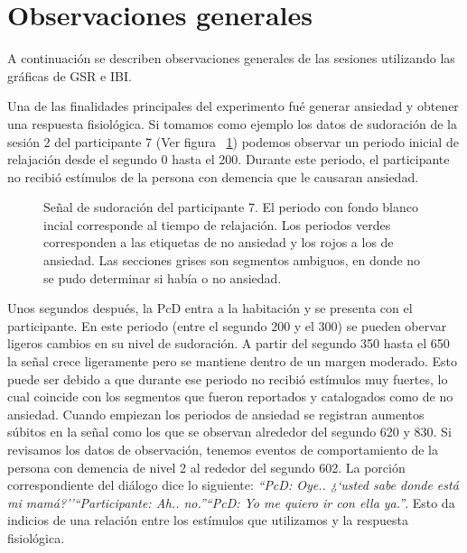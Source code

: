 \section{Observaciones generales}
A continuaci\'on se describen observaciones generales de las sesiones utilizando las gr\'aficas de GSR e IBI.

Una de las finalidades principales del experimento fu\'e generar ansiedad y obtener una respuesta fisiol\'ogica. Si tomamos como ejemplo los datos de sudoraci\'on de la sesi\'on 2 del participante 7 (Ver figura ~\ref{fig:anxietyinduction}) podemos observar un periodo inicial de relajaci\'on desde el segundo 0 hasta el 200. Durante este periodo, el participante no recibi\'o est\'imulos de la persona con demencia que le causaran ansiedad.
\begin{figure}[h!]
        \centering
        \caption{Se\~nal de sudoraci\'on del participante 7. El periodo con fondo blanco incial corresponde al tiempo de relajaci\'on. Los periodos verdes corresponden a las etiquetas de no ansiedad y los rojos a los de ansiedad. Las secciones grises son segmentos ambiguos, en donde no se pudo determinar si hab\'ia o no ansiedad.}\label{fig:anxietyinduction}

\end{figure}

Unos segundos despu\'es, la PcD entra a la habitaci\'on y se presenta con el participante. En este periodo (entre el segundo 200 y el 300) se pueden obervar ligeros cambios en su nivel de sudoraci\'on. A partir del segundo 350 hasta el 650 la se\~nal crece ligeramente pero se mantiene dentro de un margen moderado. Esto puede ser debido a que durante ese periodo no recibi\'o est\'imulos muy fuertes, lo cual coincide con los segmentos que fueron reportados y catalogados como de no ansiedad. Cuando empiezan los periodos de ansiedad se registran aumentos s\'ubitos en la se\~nal como los que se observan alrededor del segundo 620 y 830. Si revisamos los datos de observaci\'on, tenemos eventos de comportamiento de la persona con demencia de nivel 2 al rededor del segundo 602. La porci\'on correspondiente del di\'alogo dice lo siguiente: \textit{``PcD: Oye.. ¿`usted sabe donde está mi mamá?''}\textit{``Participante: Ah.. no.''}\textit{``PcD: Yo me quiero ir con ella ya.''}. Esto da indicios de una relaci\'on entre los est\'imulos que utilizamos y la respuesta fisiol\'ogica.

